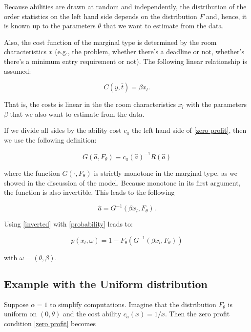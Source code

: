 \documentclass[]{article}
\theoremstyle{plain} %
\newcommand\deadline{\bar{t}}
\newcommand\target{\underline{y}}
\newcommand\cability{c_{a}}
\newcommand\mtype{\hat{a}}
\begin{document}
Because abilities are drawn at random and independently, the
distribution of the order statistics on the left hand side depends on
the distribution \(F\) and, hence, it is known up to the parameters
\(\theta\) that we want to estimate from the data.

Also, the cost function of the marginal type is determined by the room
characteristics \(x\) (e.g., the problem, whether there's a deadline or
not, whether's there's a minimum entry requirement or not). The
following linear relationship is assumed:

\begin{equation}
    C(\target, \deadline) =  \beta x_l.
\end{equation}

That is, the costs is linear in the the room characteristics \(x_l\)
with the parameters \(\beta\) that we also want to estimate from the
data.

If we divide all sides by the ability cost \(\cability\) the left hand
side of \eqref{zero profit}, then we use the following definition:

\begin{equation}
    G(\mtype, F_{\theta}) \equiv \cability(\mtype)^{-1} R (\mtype)
\end{equation}

where the function \(G(\cdot, F_{\theta})\) is strictly monotone in the
marginal type, as we showed in the discussion of the model. Because
monotone in its first argument, the function is also invertible. This
leads to the following

\begin{equation}
    \label{inverted}
    \mtype = G^{-1}(\beta x_l, F_{\theta}). 
\end{equation}

Using \eqref{inverted} with \eqref{probability} leads to:

\begin{equation}
    p(x_l, \omega) = 1 - F_{\theta}( G^{-1}(\beta x_l, F_{\theta}))
\end{equation}

with \(\omega = (\theta, \beta)\).

\subsection{Example with the Uniform
distribution}\label{example-with-the-uniform-distribution}

Suppose \(\alpha=1\) to simplify computations. Imagine that the
distribution \(F_\theta\) is uniform on \((0, \theta)\) and the cost
ability \(\cability(x) = 1/x\). Then the zero profit condition
\eqref{zero profit} becomes
\end{document}
